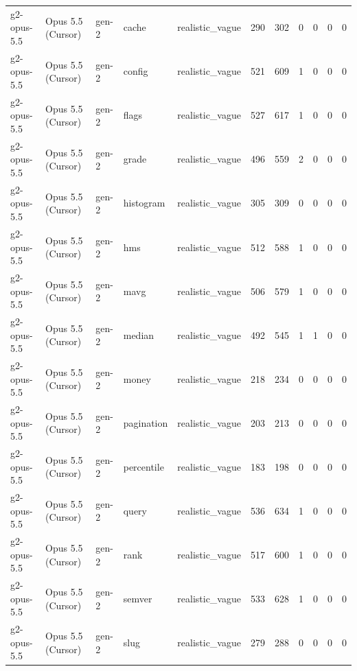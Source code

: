 \begin{tabular}{lllllllllll}
g2-opus-5.5 & Opus 5.5 (Cursor) & gen-2 & cache & realistic\_vague & 290 & 302 & 0 & 0 & 0 & 0 \\
g2-opus-5.5 & Opus 5.5 (Cursor) & gen-2 & config & realistic\_vague & 521 & 609 & 1 & 0 & 0 & 0 \\
g2-opus-5.5 & Opus 5.5 (Cursor) & gen-2 & flags & realistic\_vague & 527 & 617 & 1 & 0 & 0 & 0 \\
g2-opus-5.5 & Opus 5.5 (Cursor) & gen-2 & grade & realistic\_vague & 496 & 559 & 2 & 0 & 0 & 0 \\
g2-opus-5.5 & Opus 5.5 (Cursor) & gen-2 & histogram & realistic\_vague & 305 & 309 & 0 & 0 & 0 & 0 \\
g2-opus-5.5 & Opus 5.5 (Cursor) & gen-2 & hms & realistic\_vague & 512 & 588 & 1 & 0 & 0 & 0 \\
g2-opus-5.5 & Opus 5.5 (Cursor) & gen-2 & mavg & realistic\_vague & 506 & 579 & 1 & 0 & 0 & 0 \\
g2-opus-5.5 & Opus 5.5 (Cursor) & gen-2 & median & realistic\_vague & 492 & 545 & 1 & 1 & 0 & 0 \\
g2-opus-5.5 & Opus 5.5 (Cursor) & gen-2 & money & realistic\_vague & 218 & 234 & 0 & 0 & 0 & 0 \\
g2-opus-5.5 & Opus 5.5 (Cursor) & gen-2 & pagination & realistic\_vague & 203 & 213 & 0 & 0 & 0 & 0 \\
g2-opus-5.5 & Opus 5.5 (Cursor) & gen-2 & percentile & realistic\_vague & 183 & 198 & 0 & 0 & 0 & 0 \\
g2-opus-5.5 & Opus 5.5 (Cursor) & gen-2 & query & realistic\_vague & 536 & 634 & 1 & 0 & 0 & 0 \\
g2-opus-5.5 & Opus 5.5 (Cursor) & gen-2 & rank & realistic\_vague & 517 & 600 & 1 & 0 & 0 & 0 \\
g2-opus-5.5 & Opus 5.5 (Cursor) & gen-2 & semver & realistic\_vague & 533 & 628 & 1 & 0 & 0 & 0 \\
g2-opus-5.5 & Opus 5.5 (Cursor) & gen-2 & slug & realistic\_vague & 279 & 288 & 0 & 0 & 0 & 0 \\
\bottomrule
\end{tabular}
